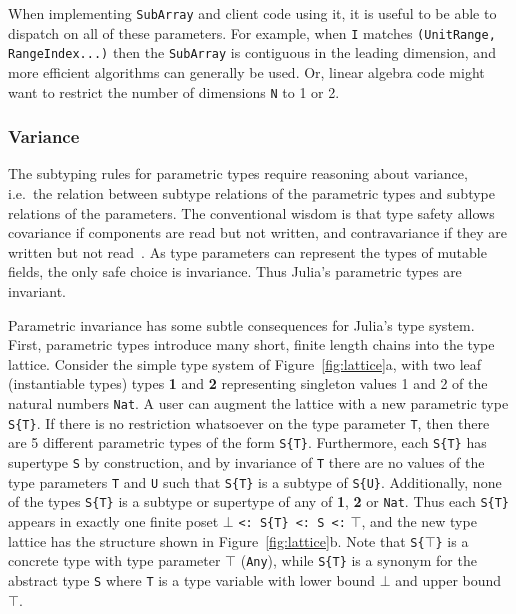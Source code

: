 \documentclass[10pt, preprint]{sigplanconf}
\begin{document}
When implementing \verb|SubArray| and client code using it, it is useful
to be able to dispatch on all of these parameters. For example, when
\verb|I| matches \verb|(UnitRange, RangeIndex...)| then the \verb|SubArray|
is contiguous in the leading dimension, and more efficient algorithms can
generally be used. Or, linear algebra code might want to restrict the
number of dimensions \verb|N| to 1 or 2.



\subsubsection{Variance}

The subtyping rules for parametric types require reasoning about variance,
i.e.\ the relation between subtype relations of the parametric types and
subtype relations of the parameters. The conventional wisdom is that type
safety allows covariance if components are read but not written, and
contravariance if they are written but not read~\cite{Castagna1995}. As type
parameters can represent the types of mutable fields, the only safe choice is
invariance. Thus Julia's parametric types are invariant.

Parametric invariance has some subtle consequences for Julia's type system.
First, parametric types introduce many short, finite length chains into the
type lattice. Consider the simple type system of
Figure~\ref{fig:lattice}a, with two leaf (instantiable types) types \textbf{1}
and \textbf{2} representing singleton values 1 and 2 of the natural numbers
\verb|Nat|. A user can augment the lattice with a new parametric type
\verb|S{T}|. If there is no restriction whatsoever on the type parameter
\verb|T|, then there are 5 different parametric types of the form \verb|S{T}|.
Furthermore, each \verb|S{T}| has supertype \verb|S| by construction, and by
invariance of \verb|T| there are no values of the type parameters \verb|T| and
\verb|U| such that \verb|S{T}| is a subtype of \verb|S{U}|. Additionally, none
of the types \verb|S{T}| is a subtype or supertype of any of \textbf{1},
\textbf{2} or \verb|Nat|. Thus each \verb|S{T}| appears in exactly one finite
poset $\bot$ \verb|<: S{T} <: S <:| $\top$, and the new type lattice has the
structure shown in Figure~\ref{fig:lattice}b. Note that \verb|S{|$\top$\verb|}|
is a concrete type with type parameter $\top$ (\verb|Any|), while \verb|S{T}|
is a synonym for the abstract type \verb|S| where \verb|T| is a type variable
with lower bound $\bot$ and upper bound $\top$.
\end{document}
